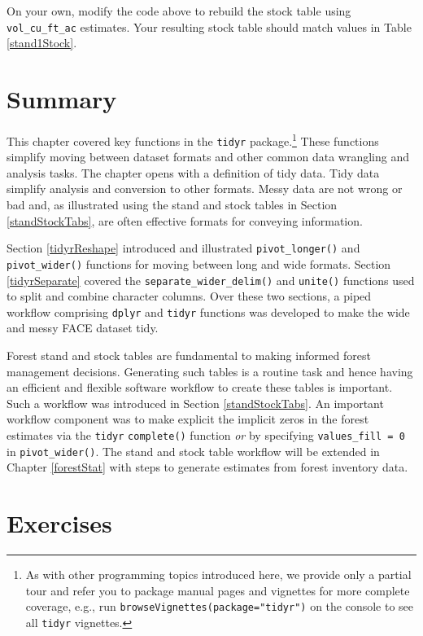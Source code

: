 \documentclass[
  11pt,
]{krantz}
\theoremstyle{definition}
\theoremstyle{definition}
\theoremstyle{definition}
\theoremstyle{definition}
\theoremstyle{remark}
\begin{document}
On your own, modify the code above to rebuild the stock table using \texttt{vol\_cu\_ft\_ac} estimates. Your resulting stock table should match values in Table \ref{stand1Stock}.

\hypertarget{summaryTidr}{%
\section{Summary}\label{summaryTidr}}

This chapter covered key functions in the \texttt{tidyr} package.\footnote{As with other programming topics introduced here, we provide only a partial tour and refer you to package manual pages and vignettes for more complete coverage, e.g., run \texttt{browseVignettes(package="tidyr")} on the console to see all \texttt{tidyr} vignettes.} These functions simplify moving between dataset formats and other common data wrangling and analysis tasks. The chapter opens with a definition of tidy data. Tidy data simplify analysis and conversion to other formats. Messy data are not wrong or bad and, as illustrated using the stand and stock tables in Section \ref{standStockTabs}, are often effective formats for conveying information.

Section \ref{tidyrReshape} introduced and illustrated \texttt{pivot\_longer()} and \texttt{pivot\_wider()} functions for moving between long and wide formats. Section \ref{tidyrSeparate} covered the \texttt{separate\_wider\_delim()} and \texttt{unite()} functions used to split and combine character columns. Over these two sections, a piped workflow comprising \texttt{dplyr} and \texttt{tidyr} functions was developed to make the wide and messy FACE dataset tidy.

Forest stand and stock tables are fundamental to making informed forest management decisions. Generating such tables is a routine task and hence having an efficient and flexible software workflow to create these tables is important. Such a workflow was introduced in Section \ref{standStockTabs}. An important workflow component was to make explicit the implicit zeros in the forest estimates via the \texttt{tidyr} \texttt{complete()} function \emph{or} by specifying \texttt{values\_fill\ =\ 0} in \texttt{pivot\_wider()}. The stand and stock table workflow will be extended in Chapter \ref{forestStat} with steps to generate estimates from forest inventory data.

\hypertarget{exercisesTidyr}{%
\section{Exercises}\label{exercisesTidyr}}
\end{document}
